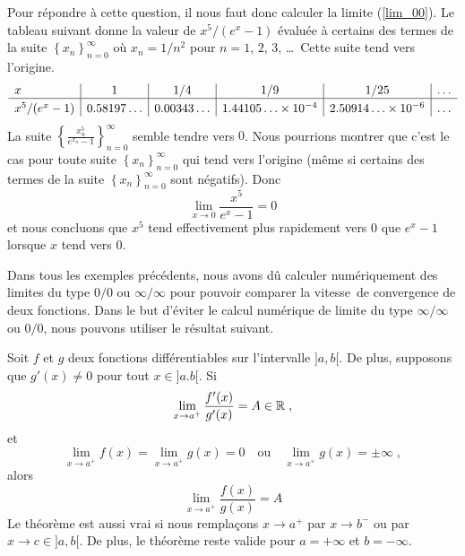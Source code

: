{\begin{egg}
Pour répondre à cette question, il nous faut donc calculer la limite
(\ref{lim_00}).   Le tableau suivant donne la valeur de $x^5/(e^x-1)$
évaluée à certains des termes de la suite 
$\displaystyle \left\{ x_n \right\}_{n=0}^\infty$ où $x_n = 1/n^2$
pour $n=1$, $2$, $3$, \ldots\  Cette suite tend vers l'origine.
\[
\begin{array}{l|c|c|c|c|c}
x & 1 & 1/4 & 1/9 & 1/25 & \ldots \\
\hline
\rule[-0.2ex]{0em}{1.2em} x^5/(e^x-1) & 0.58197\ldots & 0.00343\ldots &
1.44105\ldots\times 10^{-4} & 2.50914\ldots \times 10^{-6} & \ldots
\end{array}
\]
La suite
$\displaystyle \left\{ \frac{x_n^5}{e^{x_n}-1} \right\}_{n=0}^\infty$
semble tendre vers $0$.  Nous pourrions montrer que c'est le cas pour
toute suite $\displaystyle \left\{ x_n \right\}_{n=0}^\infty$ qui tend
vers l'origine (même si certains des termes de la suite
$\displaystyle \left\{ x_n \right\}_{n=0}^\infty$ sont négatifs).
Donc
\[
\lim_{x\rightarrow 0} \frac{x^5}{e^x-1} = 0
\]
et nous concluons que $x^5$ tend effectivement plus rapidement vers $0$
que $e^x-1$ lorsque $x$ tend vers $0$.
\label{egg_hosp3}
\end{egg}


Dans tous les exemples précédents, nous avons dû calculer
numériquement des limites du type $0/0$ ou $\infty/\infty$ pour
pouvoir comparer la \lgm vitesse\rgm\ de convergence de deux
fonctions.  Dans le but d'éviter le calcul numérique de limite du type
$\infty/\infty$ ou $0/0$, nous pouvons utiliser le résultat suivant.

\begin{theorem} 
Soit $f$ et $g$ deux fonctions différentiables sur
l'intervalle $]a,b[$.  De plus, supposons que $g'(x) \neq 0$ pour tout
$x\in ]a.b[$.  Si
\[
\lim_{x\rightarrow a^+} \frac{f'(x)}{g'(x)} = A \in \mathbb{R} \; ,
\]
et
\[
\lim_{x\rightarrow a^+} f(x) = \lim_{x\rightarrow a^+} g(x) = 0
\quad \text{ou} \quad
\lim_{x\rightarrow a^+} g(x) = \pm \infty \; ,
\]
alors
\[
\lim_{x\rightarrow a^+} \frac{f(x)}{g(x)} = A
\]
Le théorème est aussi vrai si nous remplaçons $x\rightarrow a^+$ par
$x\rightarrow b^-$ ou par $x \to c \in ]a,b[$.  De plus, le théorème
reste valide pour $a=+\infty$ et $b=-\infty$.
\end{theorem}

}
